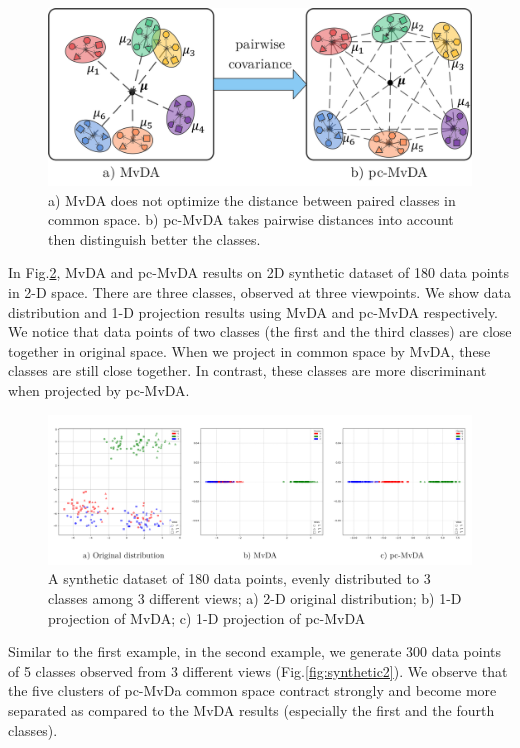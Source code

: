         \begin{figure}[htbp]
            \centering
            \includegraphics[width=0.7\linewidth]{Figs/pc-MvDA.png}
            \caption{a) MvDA does not optimize the distance between paired classes in common space. b) pc-MvDA takes pairwise distances into account then distinguish better the classes.}
            \label{fig:pc-MvDA}
        \end{figure}

        In Fig.\ref{fig:synthetic1}, MvDA and pc-MvDA results on 2D synthetic dataset of 180 data points in 2-D space. There are three classes, observed at three viewpoints. We show data distribution and 1-D projection results using MvDA and pc-MvDA respectively. We notice that data points of two classes (the first and the third classes) are close together in original space. When we project in common space by MvDA, these classes are still close together. In contrast, these classes are more discriminant when projected by pc-MvDA.

        \begin{figure}[htbp]
            \centering
            \includegraphics[width=1\linewidth]{Figs/Synthetic1.png}
            \caption{A synthetic dataset of 180 data points, evenly distributed to 3 classes among 3 different views; a) 2-D original distribution; b) 1-D projection of MvDA; c) 1-D projection of pc-MvDA}
            \label{fig:synthetic1}
        \end{figure}

        Similar to the first example, in the second example, we generate 300 data points of 5 classes observed from 3 different views (Fig.\ref{fig:synthetic2}). We observe that the five clusters of pc-MvDa common space contract strongly and become more separated as compared to the MvDA results (especially the first and the fourth classes).

